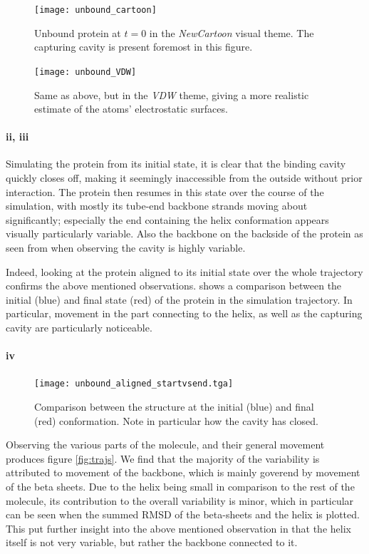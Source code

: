 \documentclass[10pt]{article}\usepackage[]{graphicx}\usepackage[]{color}
\theoremstyle{plain}
\begin{document}
\begin{multicols*}{2}
	\begin{figure}[H]
		\centering
		\texttt{[image: unbound\_cartoon]}
		\caption{Unbound protein at $t=0$ in the \emph{NewCartoon} visual theme. The capturing cavity is present foremost in this figure.}
		\label{fig:unbound_cartoon}
	\end{figure}
	
	\begin{figure}[H]
		\centering
		\texttt{[image: unbound\_VDW]}
		\caption{Same as above, but in the \emph{VDW} theme, giving a more realistic estimate of the atoms' electrostatic surfaces.}
		\label{fig:unbound_VDW}
	\end{figure}
		
	\paragraph*{ii, iii}
	Simulating the protein from its initial state, it is clear that the binding cavity quickly closes off, making it seemingly inaccessible from the outside without prior interaction. The protein then resumes in this state over the course of the simulation, with mostly its tube-end backbone strands moving about significantly; especially the end containing the helix conformation appears visually particularly variable. Also the backbone on the backside of the protein as seen from when observing the cavity is highly variable. 
	
	Indeed, looking at the protein aligned to its initial state over the whole trajectory confirms the above mentioned observations.  shows a comparison between the initial (blue) and final state (red) of the protein in the simulation trajectory. In particular, movement in the part connecting to the helix, as well as the capturing cavity are particularly noticeable. 
		
	\paragraph*{iv}
	\begin{figure}[H]
		\centering
		\texttt{[image: unbound\_aligned\_startvsend.tga]}
		\caption{Comparison between the structure at the initial (blue) and final (red) conformation. Note in particular how the cavity has closed.}
		\label{fig:unbound_startvsend}
	\end{figure}
	
	Observing the various parts of the molecule, and their general movement produces figure \cref{fig:trajs}. We find that the majority of the variability is attributed to movement of the backbone, which is mainly goverend by movement of the beta sheets. Due to the helix being small in comparison to the rest of the molecule, its contribution to the overall variability is minor, which in particular can be seen when the summed RMSD of the beta-sheets and the helix is plotted. This put further insight into the above mentioned observation in that the helix itself is not very variable, but rather the backbone connected to it.
		

\end{multicols*}
\end{document}

